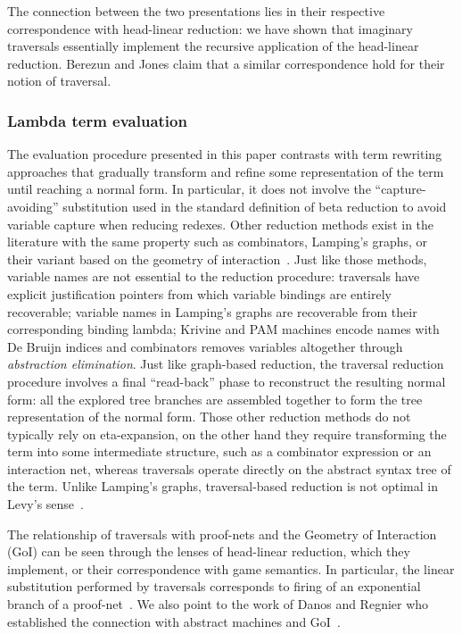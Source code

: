 \documentclass{elsarticle}
\theoremstyle{plain}
\theoremstyle{definition}
\begin{document}
The connection between the two presentations lies in their respective correspondence with head-linear reduction: we have shown that imaginary traversals essentially implement the recursive application of the head-linear reduction. Berezun and Jones claim that a similar correspondence hold for their notion of traversal.

\subsubsection{Lambda term evaluation}
The evaluation procedure presented in this paper contrasts with term rewriting approaches that gradually transform and refine some representation of the term until reaching a normal form. In particular, it does not involve the ``capture-avoiding'' substitution used in the standard definition of beta reduction to avoid variable capture when reducing redexes. Other reduction methods exist in the literature with the same property such as combinators, Lamping's graphs, or their variant based on the geometry of interaction~\cite{Lamping:1989:AOL:96709.96711, Gonthier:1992:GOL:143165.143172, curry_combinatorylogic, Barendregt84, the-implementation-of-functional-programming-languages}.
Just like those methods, variable names are not essential to the reduction procedure: traversals have explicit justification pointers from which variable bindings are entirely recoverable; variable names in Lamping's graphs are recoverable from their corresponding binding lambda;
Krivine and PAM machines encode names with De Bruijn indices
and combinators removes variables altogether through \emph{abstraction elimination}.
Just like graph-based reduction, the traversal reduction procedure involves a final ``read-back'' phase to reconstruct the resulting normal form: all the explored tree branches are assembled together to form the tree representation of the normal form. Those other reduction methods do not typically rely on eta-expansion, on the other hand they require transforming the term into some intermediate structure, such as a combinator expression or an interaction net, whereas traversals operate directly on the abstract syntax tree of the term. Unlike Lamping's graphs, traversal-based reduction is not optimal in Levy's sense~\cite{optimal-reduction-levy}.

The relationship of traversals with proof-nets and the Geometry of Interaction (GoI) can be seen through the lenses of head-linear reduction, which they implement, or their correspondence with game semantics. In particular, the linear substitution performed by traversals corresponds to firing of an exponential branch of a proof-net~\cite{MASCARI1994111}. We also point to the work of Danos and Regnier who established the connection with abstract machines and GoI~\cite{danosherbelinregnier1996}.
\end{document}
